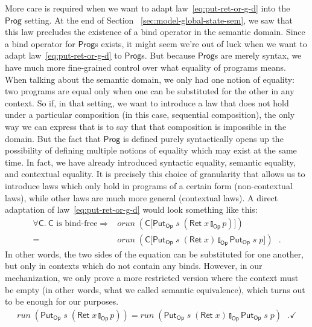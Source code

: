 \documentclass{llncs}
\newcommand{\Conid}[1]{\mathit{#1}}
\newcommand{\Varid}[1]{\mathit{#1}}
\let\Varid\mathit
\let\Conid\mathsf
\begin{document}
More care is required when we want to adapt law~\eqref{eq:put-ret-or-g-d}
into the \ensuremath{\Conid{Prog}} setting. At the end of Section~
\ref{sec:model-global-state-sem}, we saw that this law precludes the existence
of a bind operator in the semantic domain.
Since a bind operator for \ensuremath{\Conid{Prog}}s exists, it might seem we're out of luck when
we want to adapt law~\eqref{eq:put-ret-or-g-d} to \ensuremath{\Conid{Prog}}s.
But because \ensuremath{\Conid{Prog}}s are merely syntax, we have much more fine-grained control
over what equality of programs means.
When talking about the semantic domain, we only had one notion of equality: two
programs are equal only when one can be substituted for the other in any
context. So if, in that setting, we want to introduce a law that does not hold
under a particular composition (in this case, sequential composition), the only
way we can express that is to say that that composition is impossible in the
domain.
But the fact that \ensuremath{\Conid{Prog}} is defined purely syntactically opens up the
possibility of defining multiple notions of equality which may exist at the same
time. In fact, we have already introduced syntactic equality, semantic equality, and
contextual equality. It is precisely this choice of granularity that allows us
to introduce laws which only hold in programs of a certain form (non-contextual
laws), while other laws are much more general (contextual laws). A direct
adaptation of law~\eqref{eq:put-ret-or-g-d} would look something like this:
\begin{align*}
  \forall \ensuremath{\Conid{C}}.~ \ensuremath{\Conid{C}} \text{ is bind-free} \Rightarrow &\ensuremath{\Varid{orun}\;(\Conid{C}\lbrack\Conid{Put}_\Conid{Op}\;\Varid{s}\;(\Conid{Ret}\;\Varid{x}\mathbin{\talloblong}_\Conid{Op}\Varid{p})\rbrack)} \\
  = &\ensuremath{\Varid{orun}\;(\Conid{C}\lbrack\Conid{Put}_\Conid{Op}\;\Varid{s}\;(\Conid{Ret}\;\Varid{x})\mathbin{\talloblong}_\Conid{Op}\Conid{Put}_\Conid{Op}\;\Varid{s}\;\Varid{p}\rbrack)} \mbox{~~.}
\end{align*}
In other words, the two sides of the equation can be substituted for one
another, but only in contexts which do not contain any binds.
However, in our mechanization, we only prove a more restricted version where
the context must be empty (in other words, what we called semantic equivalence),
which turns out to be enough for our purposes.
\begin{align}
  \ensuremath{\Varid{run}\;(\Conid{Put}_\Conid{Op}\;\Varid{s}\;(\Conid{Ret}\;\Varid{x}\mathbin{\talloblong}_\Conid{Op}\Varid{p}))} = \ensuremath{\Varid{run}\;(\Conid{Put}_\Conid{Op}\;\Varid{s}\;(\Conid{Ret}\;\Varid{x})\mathbin{\talloblong}_\Conid{Op}\Conid{Put}_\Conid{Op}\;\Varid{s}\;\Varid{p})} \mbox{~~.} \label{eq:put-ret-or-g} \checkmark
\end{align}
\end{document}
